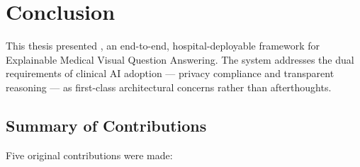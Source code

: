 \chapter{Conclusion}
\label{ch:conclusion}

This thesis presented \medxplain, an end-to-end, hospital-deployable framework
for Explainable Medical Visual Question Answering. The system addresses the
dual requirements of clinical AI adoption --- privacy compliance and
transparent reasoning --- as first-class architectural concerns rather than
afterthoughts.

\section{Summary of Contributions}
\label{sec:summary}

Five original contributions were made:


